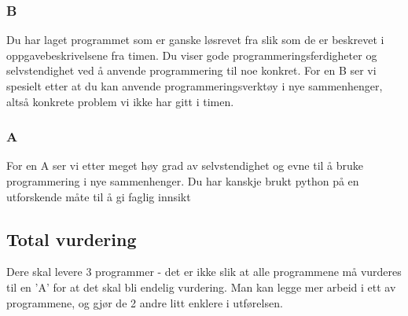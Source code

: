 \documentclass[12pt, titlepage]{article}
\begin{document}
\subsubsection*{B}
Du har laget programmet som er ganske løsrevet fra slik som de er beskrevet i oppgavebeskrivelsene fra timen.
Du viser gode programmeringsferdigheter og selvstendighet ved å anvende programmering til noe konkret.
For en B ser vi spesielt etter at du kan anvende programmeringsverktøy i nye sammenhenger, altså konkrete problem vi ikke har gitt i timen.

\subsubsection*{A}
For en A ser vi etter meget høy grad av selvstendighet og evne til å bruke programmering i nye sammenhenger.
Du har kanskje brukt python på en utforskende måte til å gi faglig innsikt

\subsection*{Total vurdering}

Dere skal levere 3 programmer - det er ikke slik at alle programmene må vurderes til en 'A' for at det skal bli endelig vurdering.
Man kan legge mer arbeid i ett av programmene, og gjør de 2 andre litt enklere i utførelsen.



\end{document}
